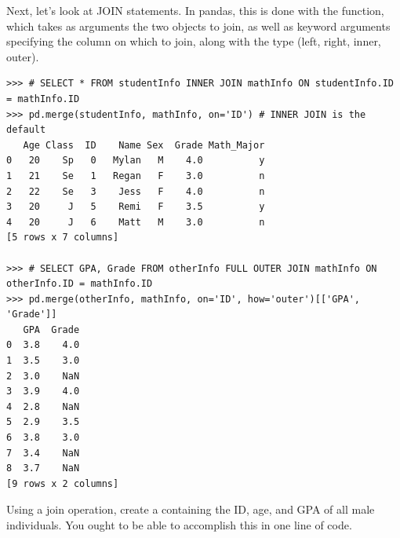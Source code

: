 Next, let's look at JOIN statements. In pandas, this is done with the  function,
which takes as arguments the two  objects to join, as well as keyword arguments specifying
the column on which to join, along with the type (left, right, inner, outer).

\begin{lstlisting}
>>> # SELECT * FROM studentInfo INNER JOIN mathInfo ON studentInfo.ID = mathInfo.ID
>>> pd.merge(studentInfo, mathInfo, on='ID') # INNER JOIN is the default
   Age Class  ID    Name Sex  Grade Math_Major
0   20    Sp   0   Mylan   M    4.0          y
1   21    Se   1   Regan   F    3.0          n
2   22    Se   3    Jess   F    4.0          n
3   20     J   5    Remi   F    3.5          y
4   20     J   6    Matt   M    3.0          n
[5 rows x 7 columns]

>>> # SELECT GPA, Grade FROM otherInfo FULL OUTER JOIN mathInfo ON otherInfo.ID = mathInfo.ID
>>> pd.merge(otherInfo, mathInfo, on='ID', how='outer')[['GPA', 'Grade']]
   GPA  Grade
0  3.8    4.0
1  3.5    3.0
2  3.0    NaN
3  3.9    4.0
4  2.8    NaN
5  2.9    3.5
6  3.8    3.0
7  3.4    NaN
8  3.7    NaN
[9 rows x 2 columns]
\end{lstlisting}

\begin{problem}
Using a join operation, create a  containing the ID, age, and GPA of all male individuals.
You ought to be able to accomplish this in one line of code.
\end{problem}

